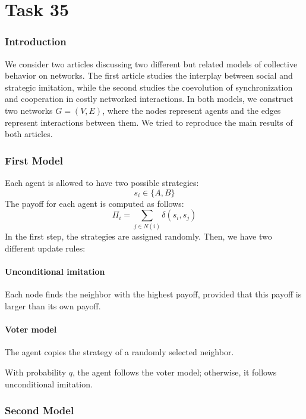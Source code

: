 \chapter{Task 35}


\subsection{Introduction}
We consider two articles discussing two different but related models of collective behavior on networks. The first article studies the interplay between social and strategic imitation, while the second studies the coevolution of synchronization and cooperation in costly networked interactions.
\noindent
In both models, we construct two networks \(G=(V,E)\), where the nodes represent agents and the edges represent interactions between them. We tried to reproduce the main results of both articles.

\subsection{First Model}\cite{vilone2012}

\noindent
Each agent is allowed to have two possible strategies:
\[
s_i \in \{A, B\}
\]
\noindent
The payoff for each agent is computed as follows:
\[
\Pi_i = \sum_{j \in N(i)} \delta(s_i, s_j)
\]
\noindent
In the first step, the strategies are assigned randomly. Then, we have two different update rules:

\subsubsection{Unconditional imitation}

Each node finds the neighbor with the highest payoff, provided that this payoff is larger than its own payoff.

\subsubsection{Voter model}

The agent copies the strategy of a randomly selected neighbor.

\noindent
With probability \(q\), the agent follows the voter model; otherwise, it follows unconditional imitation.
\newpage

\subsection{Second Model}\cite{antonioni2017}

